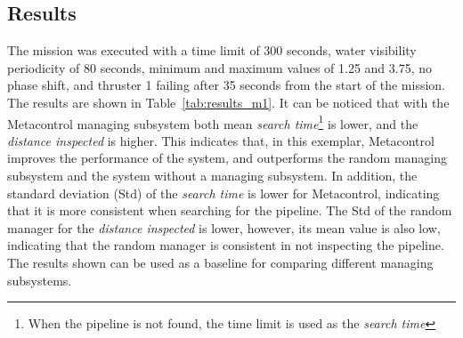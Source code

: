 \subsection{Results}
The mission was executed with a time limit of 300 seconds, water visibility  periodicity of 80 seconds, minimum and maximum values of 1.25 and 3.75, no phase shift, and thruster 1 failing after 35 seconds from the start of the mission. The results are shown in Table~\ref{tab:results_m1}. It can be noticed that with the Metacontrol managing subsystem both mean \emph{search time}\footnote{When the pipeline is not found, the time limit is used as the \emph{search time}} is lower, and the \emph{distance inspected} is higher.
This indicates that, in this exemplar, Metacontrol improves the performance of the system, and outperforms the random managing subsystem and the system without a managing subsystem.
In addition, the standard deviation (Std) of the \emph{search time} is lower for Metacontrol, indicating that it is more consistent when searching for the pipeline. The Std of the random manager for the \emph{distance inspected} is lower, however, its mean value is also low, indicating that the random manager is consistent in not inspecting the pipeline.
The results shown can be used as a baseline for comparing different managing subsystems.

\begin{table}[t]
\caption{Mission results}\label{tab:results_m1}
\centering
\end{table}

